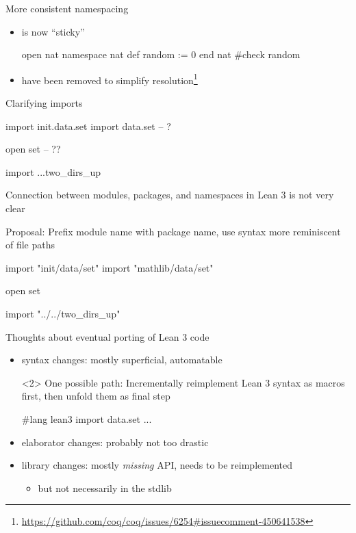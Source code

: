 \documentclass[t]{beamer}
\begin{document}
\begin{frame}[fragile]{More consistent namespacing }
  \begin{itemize}
  \item {} is now ``sticky''
\begin{leancode}
open nat
namespace nat
  def random := 0
end nat
#check random
\end{leancode}
    \pause
  \item {} have been removed to simplify resolution\footnote{\url{https://github.com/coq/coq/issues/6254\#issuecomment-450641538}}
  \end{itemize}
\end{frame}

\begin{frame}[fragile]{Clarifying imports }
\begin{leancode}
import init.data.set
import data.set  -- ?

open set  -- ??

import ...two_dirs_up
\end{leancode}
  Connection between modules, packages, and namespaces in Lean 3 is not very clear
  \pause

  Proposal: Prefix module name with package name, use syntax more reminiscent of
  file paths

\begin{leancode}
import "init/data/set"
import "mathlib/data/set"

open set

import "../../two_dirs_up"
\end{leancode}
\end{frame}

\begin{frame}[fragile]{Thoughts about eventual porting of Lean 3 code}
  \begin{itemize}
  \item syntax changes: mostly superficial, automatable
    \pause

    \begin{onlyenv}<2>
    One possible path: Incrementally reimplement Lean 3 syntax as macros first, then unfold
    them as final step
\begin{leancode}
#lang lean3
import data.set
...
\end{leancode}
    \end{onlyenv}
    \pause
  \item elaborator changes: probably not too drastic
    \pause
  \item library changes: mostly \emph{missing} API, needs to be reimplemented
    \begin{itemize}
    \item but not necessarily in the stdlib
    \end{itemize}
  \end{itemize}
\end{frame}
\end{document}
